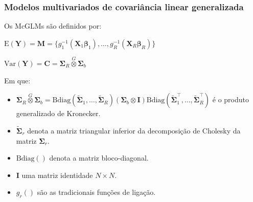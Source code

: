 \documentclass[10pt,
  aspectratio=169,
  serif,
  mathserif,
  professionalfont,
  compress,
  handout,
  ]{beamer}\usepackage[]{graphicx}\usepackage[]{color}
\begin{document}
\begin{frame}
\frametitle{Modelos multivariados de covariância linear generalizada}

Os McGLMs são definidos por:

\begin{center}
$\mathrm{E}(\boldsymbol{Y}) = \boldsymbol{M} = \{g_1^{-1}(\boldsymbol{X}_1 \boldsymbol{\beta}_1), \ldots, g_R^{-1}(\boldsymbol{X}_R \boldsymbol{\beta}_R)\}$

$\mathrm{Var}(\boldsymbol{Y}) = \boldsymbol{C} = \boldsymbol{\Sigma}_R \overset{G} \otimes \boldsymbol{\Sigma}_b$

\end{center}
    
Em que: 

\begin{itemize}
  
  \item $\boldsymbol{\Sigma}_R \overset{G} \otimes \boldsymbol{\Sigma}_b = \mathrm{Bdiag}(\tilde{\boldsymbol{\Sigma}}_1, \ldots, \tilde{\boldsymbol{\Sigma}}_R) (\boldsymbol{\Sigma}_b \otimes \boldsymbol{I}) \mathrm{Bdiag}(\tilde{\boldsymbol{\Sigma}}_1^\top, \ldots, \tilde{\boldsymbol{\Sigma}}_R^\top)$ é o produto generalizado de Kronecker.
  
  \item $\tilde{\boldsymbol{\Sigma}}_r$ denota a matriz triangular inferior da decomposição de Cholesky da matriz ${\boldsymbol{\Sigma}}_r$.
  
  \item $\mathrm{Bdiag()}$ denota a matriz bloco-diagonal.
  
  \item $\boldsymbol{I}$ uma matriz identidade $N \times N$.
  
  \item $g_r()$ são as tradicionais funções de ligação.
  
\end{itemize}

\end{frame}

\end{document}
